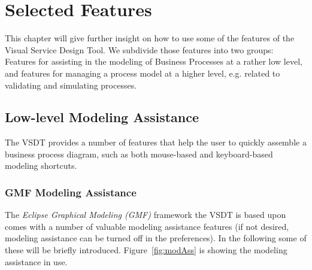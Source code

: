 \chapter{Selected Features}
\label{sec:user_features}

This chapter will give further insight on how to use some of the features of the
Visual Service Design Tool.  We subdivide those features into two groups: Features
for assisting in the modeling of Business Processes at a rather low level, and
features for managing a process model at a higher level, e.g. related to validating
and simulating processes.



\section{Low-level Modeling Assistance}

The VSDT provides a number of features that help the user to quickly assemble a
business process diagram, such as both mouse-based and keyboard-based modeling
shortcuts.


\subsection{GMF Modeling Assistance}

The \emph{Eclipse Graphical Modeling (GMF)} framework the VSDT is based upon
comes with a number of valuable modeling assistance features (if not desired,
modeling assistance can be turned off in the preferences).  In the following
some of these will be briefly introduced.  Figure~\ref{fig:modAss} is showing
the modeling assistance in use.

